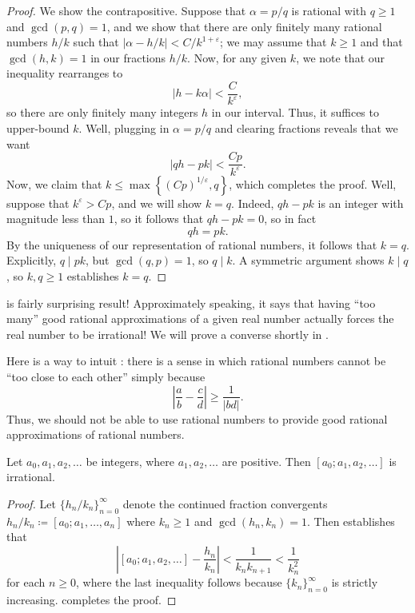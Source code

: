 \documentclass[../notes.tex]{subfiles}
\begin{document}
\begin{proof}
	We show the contrapositive. Suppose that $\alpha=p/q$ is rational with $q\ge1$ and $\gcd(p,q)=1$, and we show that there are only finitely many rational numbers $h/k$ such that $\left|\alpha-h/k\right|<C/k^{1+\varepsilon}$; we may assume that $k\ge1$ and that $\gcd(h,k)=1$ in our fractions $h/k$. Now, for any given $k$, we note that our inequality rearranges to
	\[\left|h-k\alpha\right|<\frac C{k^\varepsilon},\]
	so there are only finitely many integers $h$ in our interval. Thus, it suffices to upper-bound $k$. Well, plugging in $\alpha=p/q$ and clearing fractions reveals that we want
	\[\left|qh-pk\right|<\frac{Cp}{k^\varepsilon}.\]
	Now, we claim that $k\le\max\left\{(Cp)^{1/\varepsilon},q\right\}$, which completes the proof. Well, suppose that $k^\varepsilon>Cp$, and we will show $k=q$. Indeed, $qh-pk$ is an integer with magnitude less than $1$, so it follows that $qh-pk=0$, so in fact
	\[qh=pk.\]
	By the uniqueness of our representation of rational numbers, it follows that $k=q$. Explicitly, $q\mid pk$, but $\gcd(q,p)=1$, so $q\mid k$. A symmetric argument shows $k\mid q$, so $k,q\ge1$ establishes $k=q$.
\end{proof}
\begin{remark}
	 is fairly surprising result! Approximately speaking, it says that having ``too many'' good rational approximations of a given real number actually forces the real number to be irrational! We will prove a converse shortly in .
\end{remark}
\begin{remark}
	Here is a way to intuit : there is a sense in which rational numbers cannot be ``too close to each other'' simply because
	\[\left|\frac ab-\frac cd\right|\ge\frac1{\left|bd\right|}.\]
	Thus, we should not be able to use rational numbers to provide good rational approximations of rational numbers.
\end{remark}
\begin{corollary} \label{cor:inf-cf-is-irrat}
	Let $a_0,a_1,a_2,\ldots$ be integers, where $a_1,a_2,\ldots$ are positive. Then $[a_0;a_1,a_2,\ldots]$ is irrational.
\end{corollary}
\begin{proof}
	Let $\{h_n/k_n\}_{n=0}^\infty$ denote the continued fraction convergents $h_n/k_n\coloneqq[a_0;a_1,\ldots,a_n]$ where $k_n\ge1$ and $\gcd(h_n,k_n)=1$. Then  establishes that
	\[\left|[a_0;a_1,a_2,\ldots]-\frac{h_n}{k_n}\right|<\frac1{k_nk_{n+1}}<\frac1{k_n^2}\]
	for each $n\ge0$, where the last inequality follows because $\{k_n\}_{n=0}^\infty$ is strictly increasing.  completes the proof.
\end{proof}
\end{document}
